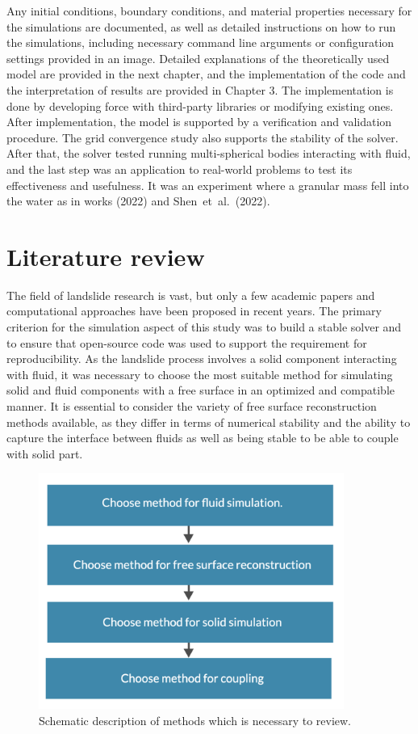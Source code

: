Any initial conditions, boundary conditions, and material properties necessary for the simulations are documented, as well as detailed instructions on how to run the simulations, including necessary command line arguments or configuration settings provided in an image. Detailed explanations of the theoretically used model are provided in the next chapter, and the implementation of the code and the interpretation of results are provided in Chapter 3. The implementation is done by developing force with third-party libraries or modifying existing ones. After implementation, the model is supported by a verification and validation procedure. The grid convergence study also supports the stability of the solver. After that, the solver tested running multi-spherical bodies interacting with fluid, and the last step was an application to real-world problems to test its effectiveness and usefulness. It was an experiment where a granular mass fell into the water as in works (2022)\cite{mao2020resolved} and Shen~et~al.~(2022)\cite{shen2022resolved}.

\section{Literature review}

The field of landslide research is vast, but only a few academic papers and computational approaches have been proposed in recent years. The primary criterion for the simulation aspect of this study was to build a stable solver and to ensure that open-source code was used to support the requirement for reproducibility. As the landslide process involves a solid component interacting with fluid, it was necessary to choose the most suitable method for simulating solid and fluid components with a free surface in an optimized and compatible manner. It is essential to consider the variety of free surface reconstruction methods available, as they differ in terms of numerical stability and the ability to capture the interface between fluids as well as being stable to be able to couple with solid part. 

\begin{figure}[!ht]
    \centering
    \includegraphics[width=10cm]{Images/chap1/lit_rew.png}
    \caption{Schematic description of methods which is necessary to review.}
    \label{fig:aims}
\end{figure}

